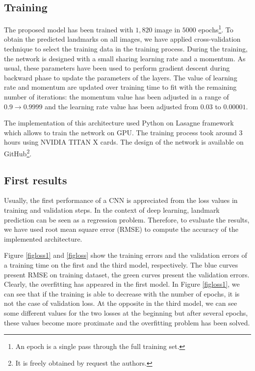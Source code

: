 \documentclass{article} %
\begin{document}
\begin{multicols}{2}
\subsection{Training}
The proposed model has been trained with $1,820$ image in $5000$ epochs\footnote{An epoch is a single pass through the full training set.}. To obtain the predicted landmarks on all images, we have applied cross-validation technique to select the training data in the training process. During the training, the network is designed with a small sharing learning rate and a momentum. As usual, these parameters have been used to perform gradient descent during backward phase to update the parameters of the layers. The value of learning rate and momentum are updated over training time to fit with the remaining number of iterations: the momentum value has been adjusted in a range of $0.9 \rightarrow 0.9999$ and the learning rate value has been adjusted from $0.03$ to $0.00001$. 

The implementation of this architecture used Python on Lasagne framework \cite{lasagne} which allows to train the network on GPU. The training process took around 3 hours using NVIDIA TITAN X cards. The design of the network is available on GitHub\footnote{It is freely obtained by request the authors.}.

\subsection{First results}
\label{Secfirstrs}
Usually, the first performance of a CNN is appreciated from the loss values in training and validation steps. In the context of deep learning, landmark prediction can be seen as a regression problem. Therefore, to evaluate the results, we have used root mean square error (RMSE) to compute the accuracy of the implemented architecture. 

Figure \ref{figloss1} and \ref{figloss} show the training errors and the validation errors of a training time on the first and the third model, respectively. The blue curves present RMSE on training dataset, the green curves present the validation errors. Clearly, the overfitting has appeared in the first model. In Figure \ref{figloss1}, we can see that if the training is able to decrease with the number of epochs, it is not the case of validation loss. At the opposite in the third model, we can see some different values for the two losses at the beginning but after several epochs, these values become more proximate and the overfitting problem has been solved.


\end{multicols}
\end{document}
